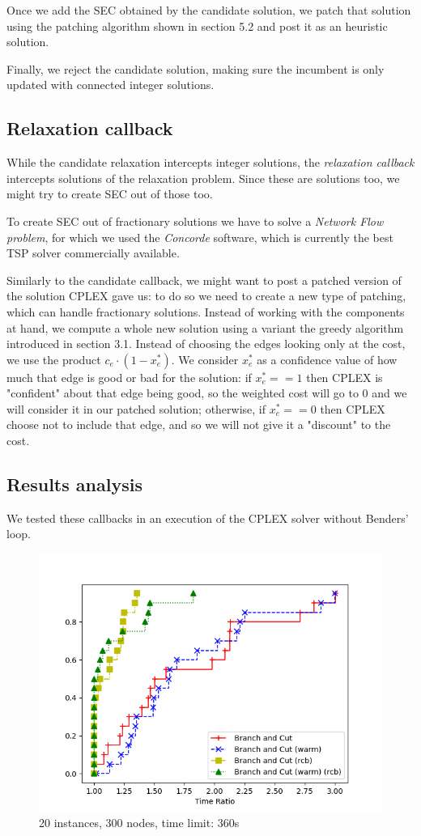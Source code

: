 Once we add the SEC obtained by the candidate solution, we patch that solution using the patching algorithm shown in section 5.2 and post it as an heuristic solution.

Finally, we reject the candidate solution, making sure the incumbent is only updated with connected integer solutions.

\subsection{Relaxation callback}
While the candidate relaxation intercepts integer solutions, the \textit{relaxation callback} intercepts solutions of the relaxation problem. Since these are solutions too, we might try to create SEC out of those too.

To create SEC out of fractionary solutions we have to solve a \textit{Network Flow problem}, for which we used the \textit{Concorde} software, which is currently the best TSP solver commercially available.

Similarly to the candidate callback, we might want to post a patched version of the solution CPLEX gave us: to do so we need to create a new type of patching, which can handle fractionary solutions. Instead of working with the components at hand, we compute a whole new solution using a variant the greedy algorithm introduced in section 3.1. Instead of choosing the edges looking only at the cost, we use the product $c_e \cdot (1 - x^*_e)$. We consider $x^*_e$ as a confidence value of how much that edge is good or bad for the solution: if $x^*_e == 1$ then CPLEX is "confident" about that edge being good, so the weighted cost will go to 0 and we will consider it in our patched solution; otherwise, if $x^*_e == 0$ then CPLEX choose not to include that edge, and so we will not give it a "discount" to the cost.

\subsection{Results analysis}

We tested these callbacks in an execution of the CPLEX solver without Benders' loop.

\FloatBarrier
\begin{figure}[h]
    \centering
    \includegraphics*[width=.6\textwidth]{../plots/perfprof_bnc_times.png}
    \caption*{20 instances, 300 nodes, time limit: 360s}
\end{figure}
\FloatBarrier


